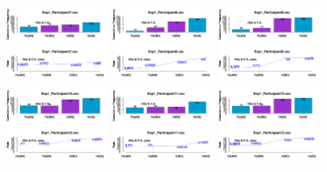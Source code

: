 \begin{figure}[th]
\includegraphics[width=0.30\textwidth]{Figures/MirrorRate_Exp1_P7} \includegraphics[width=0.30\textwidth]{Figures/MirrorRate_Exp1_P8} \includegraphics[width=0.30\textwidth]{Figures/MirrorRate_Exp1_P9}
\includegraphics[width=0.30\textwidth]{Figures/MirrorRate_Exp1_P10} \includegraphics[width=0.30\textwidth]{Figures/MirrorRate_Exp1_P11} \includegraphics[width=0.30\textwidth]{Figures/MirrorRate_Exp1_P12}

\end{figure}
